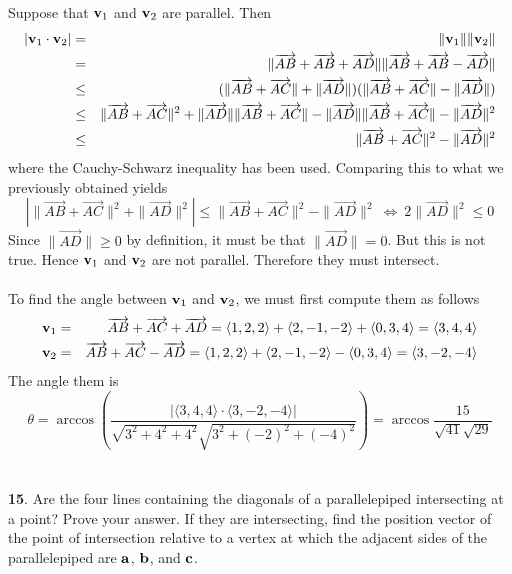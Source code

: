 \documentclass[12pt]{amsbook}
\newcommand{\la}{\langle}
\newcommand{\ra}{\rangle}
\begin{document}
Suppose that ${\bf v}_1$ and ${\bf v}_2$ are parallel. Then 
\begin{eqnarray*}
|{\bf v}_1\cdot{\bf v}_2|&=&\|{\bf v}_1\|\|{\bf v}_2\|\\
&=&\|\overrightarrow{AB}+\overrightarrow{AB}+\overrightarrow{AD}\|\|\overrightarrow{AB}+\overrightarrow{AB}-\overrightarrow{AD}\| \\
&\leq &(\|\overrightarrow{AB}+\overrightarrow{AC}\|+\|\overrightarrow{AD}\|)(\|\overrightarrow{AB}+\overrightarrow{AC}\|-\|\overrightarrow{AD}\|) \\
&\leq &\|\overrightarrow{AB}+\overrightarrow{AC}\|^2+\|\overrightarrow{AD}\|\|\overrightarrow{AB}+\overrightarrow{AC}\|-\|\overrightarrow{AD}\|\|\overrightarrow{AB}+\overrightarrow{AC}\|-\|\overrightarrow{AD}\|^2 \\
&\leq &\|\overrightarrow{AB}+\overrightarrow{AC}\|^2-\|\overrightarrow{AD}\|^2
\end{eqnarray*}
where the Cauchy-Schwarz inequality has been used. Comparing this to what we previously obtained yields
$$|\|\overrightarrow{AB}+\overrightarrow{AC}\|^2+\|\overrightarrow{AD}\|^2| \leq \|\overrightarrow{AB}+\overrightarrow{AC}\|^2-\|\overrightarrow{AD}\|^2 \ \Leftrightarrow \ 2\|\overrightarrow{AD}\|^2\leq 0$$
Since $\|\overrightarrow{AD}\| \geq 0$ by definition, it must be that $\|\overrightarrow{AD}\|=0$. But this is not true. Hence ${\bf v}_1$ and ${\bf v}_2$ are not parallel. Therefore they must intersect.
\\
\\
To find the angle between ${\bf v}_1$ and ${\bf v}_2$, we must first compute them as follows
\begin{eqnarray*}
{\bf v}_1&=&\overrightarrow{AB}+\overrightarrow{AC}+\overrightarrow{AD}=\la 1,2,2 \ra + \la 2,-1,-2 \ra + \la 0,3,4 \ra =\la 3, 4, 4 \ra\\
{\bf v}_2&=&\overrightarrow{AB}+\overrightarrow{AC}-\overrightarrow{AD}=\la 1,2,2 \ra + \la 2,-1,-2 \ra - \la 0,3,4 \ra =\la 3, -2, -4 \ra
\end{eqnarray*}
The angle them is
$$\theta=\arccos(\frac{|\la 3,4,4\ra\cdot\la 3,-2,-4\ra|}{\sqrt{3^2+4^2+4^2}\sqrt{3^2+(-2)^2+(-4)^2}})=\arccos\frac{15}{\sqrt{41}\sqrt{29}}$$
\\
\\
{\small\bf 15}. Are the four lines containing the diagonals of a parallelepiped
intersecting at a point? Prove your answer. 
If they are intersecting, find the position vector of the point 
of intersection relative to a vertex at which the adjacent sides 
of the parallelepiped are ${\bf a}$, ${\bf b}$, and ${\bf c}$.\\
\end{document}
